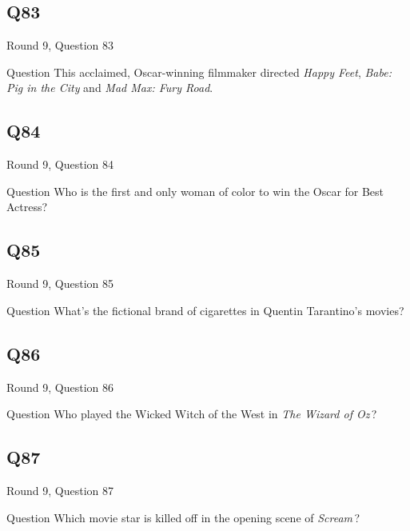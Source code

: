 \documentclass[11pt]{beamer}
\begin{document}
\subsection*{Q83}
\begin{frame}[t]{Round 9, Question 83}
  \vspace{2em}
  \begin{block}{Question}
    This acclaimed, Oscar-winning filmmaker directed \emph{Happy Feet}, \emph{Babe: Pig in the City} and \emph{Mad Max: Fury Road}.
  \end{block}
\end{frame}


\subsection*{Q84}
\begin{frame}[t]{Round 9, Question 84}
  \vspace{2em}
  \begin{block}{Question}
    Who is the first and only woman of color to win the Oscar for Best Actress?
  \end{block}
\end{frame}


\subsection*{Q85}
\begin{frame}[t]{Round 9, Question 85}
  \vspace{2em}
  \begin{block}{Question}
    What's the fictional brand of cigarettes in Quentin Tarantino's movies?
  \end{block}
\end{frame}


\subsection*{Q86}
\begin{frame}[t]{Round 9, Question 86}
  \vspace{2em}
  \begin{block}{Question}
    Who played the Wicked Witch of the West in \emph{The Wizard of Oz}\,?
  \end{block}
\end{frame}


\subsection*{Q87}
\begin{frame}[t]{Round 9, Question 87}
  \vspace{2em}
  \begin{block}{Question}
    Which movie star is killed off in the opening scene of \emph{Scream}\,?
  \end{block}
\end{frame}
\end{document}
